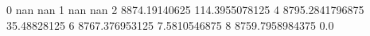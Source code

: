 0 nan nan
1 nan nan
2 8874.19140625 114.3955078125
4 8795.2841796875 35.48828125
6 8767.376953125 7.5810546875
8 8759.7958984375 0.0
